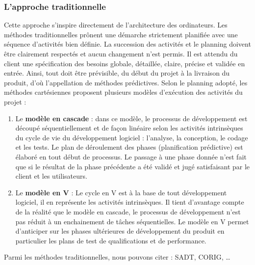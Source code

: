 \documentclass[a4paper, 12pt]{report}
\begin{document}
	\subsubsection{L'approche traditionnelle}
	Cette approche s’inspire directement de l’architecture des ordinateurs. Les méthodes traditionnelles prônent une démarche strictement planifiée avec une séquence d’activités bien définie. La succession des activités et le planning doivent être clairement respectés et aucun changement n’est permis. Il est attendu du client une spécification des besoins globale, détaillée, claire, précise et validée en entrée. Ainsi, tout doit être prévisible, du début du projet à la livraison du produit, d’où l’appellation de méthodes prédictives. \newline
	Selon le planning adopté, les méthodes cartésiennes proposent plusieurs modèles d’exécution des activités du projet :
	\begin{enumerate}
		\item Le \textbf{modèle en cascade} : dans ce modèle, le processus de développement est découpé séquentiellement et de façon linéaire selon les activités intrinsèques du cycle de vie du développement logiciel : l’analyse, la conception, le codage et les tests. Le plan de déroulement des phases (planification prédictive) est élaboré en tout début de processus. Le passage à une phase donnée n’est fait que si le résultat de la phase précédente a été validé et jugé satisfaisant par le client et les utilisateurs.
		\item Le \textbf{modèle en V} : Le cycle en V est à la base de tout développement logiciel, il en représente les activités intrinsèques. Il tient d'avantage compte de la réalité que le modèle en cascade, le processus de développement n’est pas réduit à un enchainement de tâches séquentielles. Le modèle en V permet d’anticiper sur les phases ultérieures de développement du produit en particulier les plans de test de qualifications et de performance.
	\end{enumerate}
	Parmi les méthodes traditionnelles, nous pouvons citer : SADT, CORIG, …
\end{document}

